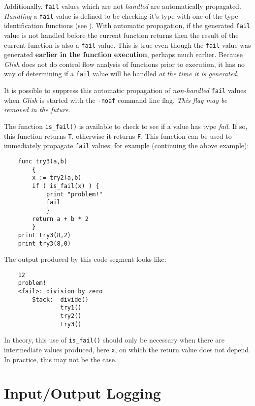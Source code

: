Additionally, {\tt fail} values which are not {\em handled} are automatically propagated.
{\em Handling} a {\tt fail} value is defined to be checking it's type with one of the
type identification functions (see ). With automatic
propagation, if the generated {\tt fail} value is not handled before the current
function returns then the result of the current function is also a {\tt fail} value.
This is true even though the {\tt fail} value was generated {\bf earlier in the
function execution}, perhaps much earlier. Because {\em Glish} does not do control
flow analysis of functions prior to execution, it has no way of determining if
a {\tt fail} value will be handled {\em at the time it is generated}.

It is possible to suppress this automatic propagation of {\em non-handled} {\tt fail}
values when {\em Glish} is started with the \verb+-noaf+ command line flag. {\em This flag
may be removed in the future.}

\label{is_fail-func2}
The function {\tt is\_fail()} is available to check to see if a value has type {\em fail}.
If so, this function returns {\tt T}, otherwise it returns {\tt F}. This function can be
used to immediately propagate {\tt fail} values; for example (continuing the above example):
\begin{verbatim}
    func try3(a,b)
        {
        x := try2(a,b)
        if ( is_fail(x) ) {
            print "problem!"
            fail
            }
        return a + b * 2
        }
    print try3(8,2)
    print try3(8,0)
\end{verbatim}
The output produced by this code segment looks like:
\begin{verbatim}
    12
    problem!
    <fail>: division by zero
        Stack:  divide()
                try1()
                try2()
                try3()
\end{verbatim}
In theory, this use of {\tt is\_fail()} should only be necessary when there
are intermediate values produced, here {\tt x}, on which the return value
does not depend. In practice, this may not be the case.

\section{Input/Output Logging}
\label{command-logging}


